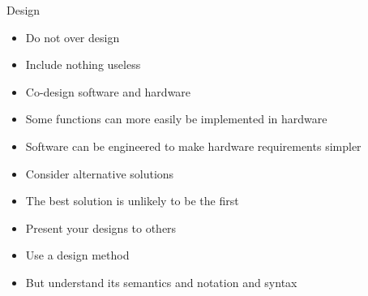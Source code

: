 \documentclass{beamer}
\begin{document}
\begin{frame}{Design}
  \begin{itemize}
  \item Do not over design
  \item Include nothing useless

  \item Co-design software and hardware
  \item Some functions can more easily be implemented in hardware
  \item Software can be engineered to make hardware requirements
    simpler
  \item Consider alternative solutions
  \item The best solution is unlikely to be the first
  \item Present your designs to others

  \item Use a design method
  \item But understand its semantics and notation and syntax
  \end{itemize}
\end{frame}


\end{document}
